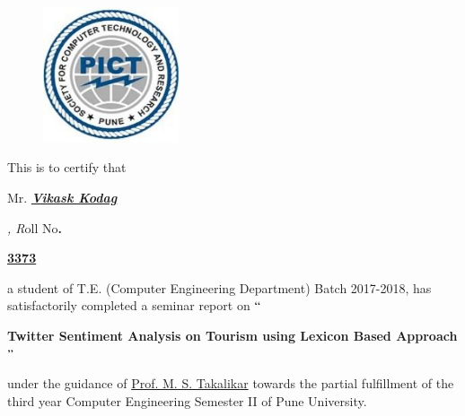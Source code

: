 \documentclass[12pt]{article}
\begin{document}

\begin{figure}[H]
	\begin{Center}
		\includegraphics[width=1.57in,height=1.57in]{./media/image10.jpg}
	\end{Center}
\end{figure}



\begin{Center}
{\fontsize{14pt}{16.8pt}\selectfont  \par}
\end{Center}\par

\begin{justify}
{\fontsize{18pt}{21.6pt}\selectfont This is to certify that {\fontsize{20pt}{24.0pt}\selectfont Mr.\textit{ \textbf{\uline{Vikask Kodag}} }{\fontsize{18pt}{21.6pt}\selectfont \textit{, R}oll No\textbf{. }{\fontsize{20pt}{24.0pt}\selectfont \textbf{\uline{3373}}{\fontsize{18pt}{21.6pt}\selectfont \uline{ }a student of T.E. (Computer Engineering Department) Batch 2017-2018, has satisfactorily completed a seminar report on $``${\fontsize{16pt}{19.2pt}\selectfont \textbf{ Twitter Sentiment Analysis on Tourism using Lexicon Based Approach$"$ }{\fontsize{18pt}{21.6pt}\selectfont  under the guidance of \uline{Prof. M. S. Takalikar} towards the partial fulfillment of the third year Computer Engineering Semester II of Pune University.\par}\par}\par}\par}\par}\par}\par}
\end{justify}\par

\begin{justify}
{\fontsize{18pt}{21.6pt}\selectfont  \par}
\end{justify}\par
\end{document}

